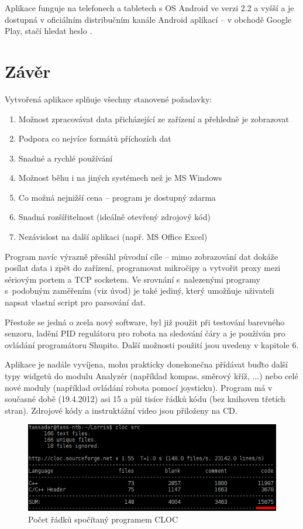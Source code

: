 \documentclass[12pt, a4paper, oneside]{article}
\newcommand{\Has}{\textcolor{green}{\CheckmarkBold}}
\begin{document}
Aplikace funguje na telefonech a tabletech s OS Android ve verzi 2.2 a vyšší a je dostupná v oficiálním distribučním kanále Android aplíkací -- v obchodě Google Play\cite{gplay}, stačí hledat heslo .

\newpage
\section*{Závěr}
Vytvořená aplikace splňuje všechny stanovené požadavky:
\begin{enumerate}[label=\Has\hspace{1.5mm}\arabic{*}.]
    \item Možnost zpracovávat data přicházející ze zařízení a přehledně je zobrazovat%
    \item Podpora co nejvíce formátů příchozích dat%
    \item Snadné a rychlé používání %
    \item Možnost běhu i na jiných systémech než je MS Windows %
    \item Co možná nejnižší cena -- program je dostupný zdarma%
    \item Snadná rozšířitelnost (ideálně otevřený zdrojový kód) %
    \item Nezávislost na další aplikaci (např. MS Office Excel) %
\end{enumerate}
Program navíc výrazně přesáhl původní cíle -- mimo zobrazování dat dokáže posílat data i zpět do zařízení, programovat mikročipy a vytvořit proxy mezi sériovým portem a TCP socketem. Ve srovnání s~nalezenými programy s~podobným zaměřením (viz úvod) je také jediný, který umožňuje uživateli napsat vlastní script pro parsování dat.

Přestože se jedná o zcela nový software, byl již použit při testování barevného senzoru, ladění PID regulátoru pro robota na sledování čáry a je používán pro ovládání programátoru Shupito. Další možnosti použití jsou uvedeny v kapitole 6.

Aplikace je nadále vyvíjena, mohu prakticky donekonečna přídávat buďto další typy widgetů do modulu Analyzér (například kompas, směrový kříž, ...) nebo celé nové moduly (například ovládání robota pomocí joysticku). Program má v současné době (19.4.2012) asi 15 a půl tisíce řádků kódu (bez knihoven třetích stran). Zdrojové kódy a instruktážní video jsou přiloženy na CD. 
\begin{figure}[H]
\begin{center}
\includegraphics[width=\textwidth]{img/cloc_edit.png}
\caption{Počet řádků spočítaný programem CLOC\cite{cloc}}
\end{center}
\end{figure}
\end{document}
